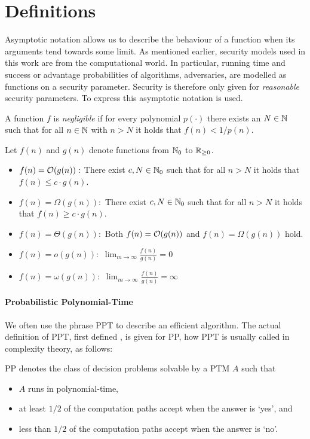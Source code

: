 \section{Definitions}
Asymptotic notation allows us to describe the behaviour of a function when its arguments tend towards some limit.
As mentioned earlier, security models used in this work are from the computational world.
In particular, running time and success or advantage probabilities of algorithms, \ie adversaries, are modelled as functions on a security parameter.
Security is therefore only given for \emph{reasonable} security parameters.
To express this asymptotic notation is used.

\begin{definition}\label{def:negligible}
A function $f$ is \emph{negligible} if for every polynomial $p(\cdot)$ there exists an $N\in\mathbb{N}$ such that for all $n\in\mathbb{N}$ with $n>N$ it holds that $f(n)<1/p(n)$.
\eod
\end{definition}

\begin{definition}\label{def:asymptotic}
Let $f(n)$ and $g(n)$ denote functions from $\mathbb{N}_0$ to $\mathbb{R}_{\geq 0}$.
\begin{itemize}
	\item $f(n)=\mathcal{O}(g(n)):$ There exist $c,N\in\mathbb{N}_0$ such that for all $n>N$ it holds that $f(n)\leq c\cdot g(n)$.
	\item $f(n)=\Omega(g(n)):$ There exist $c,N\in\mathbb{N}_0$ such that for all $n>N$ it holds that $f(n)\geq c\cdot g(n)$.
	\item $f(n)=\Theta(g(n)):$ Both $f(n)=\mathcal{O}(g(n))$ and $f(n)=\Omega(g(n))$ hold.
	\item $f(n)=o(g(n)):$ $\lim_{m\rightarrow\infty}\frac{f(n)}{g(n)}=0$
	\item $f(n)=\omega(g(n)):$ $\lim_{m\rightarrow\infty}\frac{f(n)}{g(n)}=\infty$
\end{itemize}
\eod
\end{definition}

\paragraph{Probabilistic Polynomial-Time}
We often use the phrase \ac{PPT} to describe an efficient algorithm.
The actual definition of \ac{PPT}, first defined \cite{gill1977}, is given for \ac{PP}, how \ac{PPT} is usually called in complexity theory, as follows:

\begin{definition}[\acl{PP}]\label{def:ppt}
\ac{PP} denotes the class of decision problems solvable by a \ac{PTM} $A$ such that
\begin{itemize}
	\item $A$ runs in polynomial-time,
	\item at least $1/2$ of the computation paths accept when the answer is `yes', and
	\item less than $1/2$ of the computation paths accept when the answer is `no'.
\end{itemize}
\eod
\end{definition}

